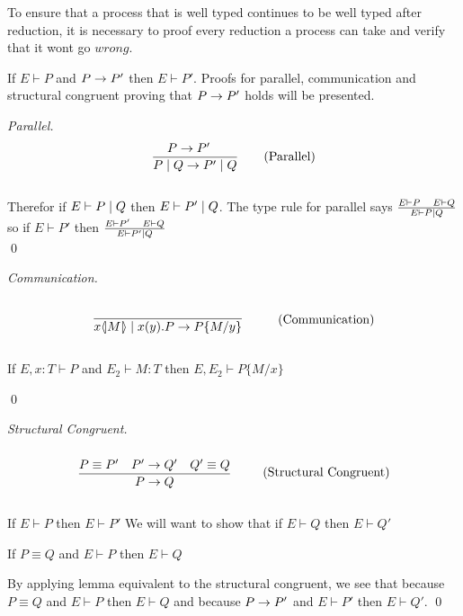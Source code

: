 


\begin{theorem}
    To ensure that a process that is well typed continues to be well typed after reduction, it is necessary to proof every reduction a process can take and verify that it wont go $wrong$.

    If $E \vdash P$ and $P\rightarrow P'$ then $E \vdash P'$.
    Proofs for parallel, communication and structural congruent proving that $P \rightarrow P'$ holds will be presented.\\

    \begin{proof}[Parallel]
        \begin{align*}
            \frac{P \rightarrow P' \quad}{P \mid Q \rightarrow P' \mid Q} \tag{Parallel}
        \end{align*}\\

    Therefor if $E \vdash P \mid Q$ then $E \vdash P' \mid Q$. The type rule for parallel says $\frac{E \vdash P\quad E \vdash Q}{E \vdash P \mid Q}$ so if $E \vdash P'$ then $\frac{E \vdash P' \quad E \vdash Q}{E \vdash P' \mid Q}$\\
        \qed
    \end{proof}

    \begin{proof}[Communication]
        \begin{align*}
            \infrule{}{\lift{x}{M}\para\inp{x}{y}P\ra P\{M/y\}} \tag{Communication}
        \end{align*}

        \begin{lemma}[Substitution]
            If $E,x:T \vdash P$ and $E_2 \vdash M:T$ then $E, E_2 \vdash P\{M/x \}$
        \end{lemma}
        \qed
    \end{proof}

    \begin{proof}[Structural Congruent]
        \begin{align*}
            \infrule{P \equiv P' \quad P' \ra Q' \quad Q' \equiv Q}{P \ra Q} \tag{Structural Congruent}
        \end{align*}


        If $E \vdash P$ then $E \vdash P'$ We will want to show that if $E \vdash Q$ then $E \vdash Q'$

        \begin{lemma}[Equivalent]
            If $P \equiv Q$ and $E \vdash P$ then $E \vdash Q$
        \end{lemma}

        By applying lemma equivalent to the structural congruent, we see that because $P \equiv Q$ and $E \vdash P$ then $E \vdash Q$ and because $P \rightarrow P'$ and $E \vdash P'$ then $E \vdash Q'$.
        \qed
    \end{proof}
\end{theorem}
\newpage

